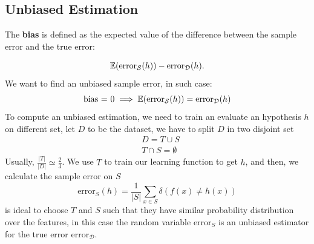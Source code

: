\documentclass[10pt, letterpaper]{report}
\begin{document}
\subsection{Unbiased Estimation}
\begin{definition}
    The \textbf{bias} is defined as the expected value of the difference between the sample error and the true error:
\end{definition}
    \begin{equation}
        {\mathbb E}(\text{error}_{\mathcal S}(h))-\text{error}_{\mathcal D}(h).
    \end{equation}
We want to find an unbiased sample error, in such case:\begin{equation}
    \text{bias = 0} \implies {\mathbb E}(\text{error}_{\mathcal S}(h))=\text{error}_{\mathcal D}(h)
\end{equation}
To compute an unbiased estimation, we need to train an evaluate an hypothesis $h$ on different set, let $D$ to be the dataset, we have to split $D$ in two disjoint set\begin{align}
    &D=T\cup S\\
    &T\cap S = \emptyset
\end{align}
Usually, $\frac{|T|}{|D|}\simeq \frac{2}{3}$.
We use $T$ to train our learning function to get $h$, and then, we calculate the sample error on $S$\begin{equation}
     \text{error}_{ S}(h)=
        \frac{1}{| S|}\sum_{x\in S}\delta(f(x)\ne h(x))
\end{equation}
is ideal to choose $T$ and $S$ such that they have similar probability distribution over the features, in this case the random variable $\text{error}_{ S}$ is an unbiased estimator for the true error $\text{error}_{ \mathcal D}$. 
\end{document}
